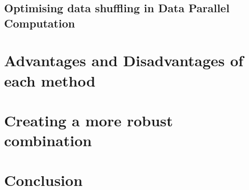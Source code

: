 \documentclass[]{article}
\begin{document}
\subsection{Optimising data shuffling in Data Parallel Computation}

\section{Advantages and Disadvantages of each method}
\subsection{}

\subsection{}

\subsection{}

\subsection{}

\subsection{}

\section{Creating a more robust combination}

\section{Conclusion}
\end{document}
